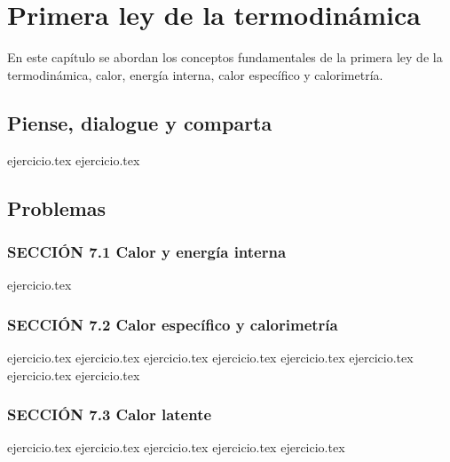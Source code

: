\chapter{Primera ley de la termodinámica}
\label{cap:primera_ley_termo}

En este capítulo se abordan los conceptos fundamentales de la primera ley de la termodinámica, calor, energía interna, calor específico y calorimetría.

\section*{Piense, dialogue y comparta}
\begin{enumerate}
    {ejercicio.tex}
    {ejercicio.tex}
\end{enumerate}

\section*{Problemas}

\subsection*{SECCIÓN 7.1 Calor y energía interna}
\begin{enumerate}
    {ejercicio.tex}
\end{enumerate}

\subsection*{SECCIÓN 7.2 Calor específico y calorimetría}
\begin{enumerate}
    \setcounter{enumi}{1}
    {ejercicio.tex}
    {ejercicio.tex}
    {ejercicio.tex}
    {ejercicio.tex}
    {ejercicio.tex}
    {ejercicio.tex}
    {ejercicio.tex}
    {ejercicio.tex}
\end{enumerate}

\subsection*{SECCIÓN 7.3 Calor latente}
\begin{enumerate}
    \setcounter{enumi}{9}
    {ejercicio.tex}
    {ejercicio.tex}
    {ejercicio.tex}
    {ejercicio.tex}
    {ejercicio.tex}
\end{enumerate}

